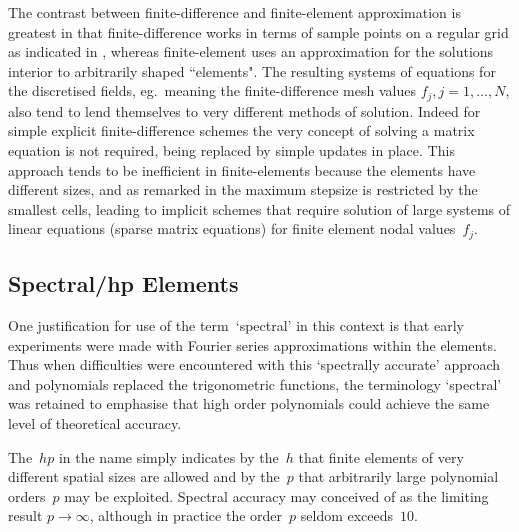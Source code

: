 The contrast between finite-difference and finite-element approximation is 
greatest in that finite-difference works in terms of sample points on a regular
grid as indicated in ,
whereas finite-element uses an approximation for the solutions interior
to arbitrarily shaped ``elements".
The resulting systems of equations for the discretised fields, eg.\
meaning the finite-difference mesh values
$f_j, j=1,\ldots,N$, also tend to lend themselves to very different methods of
solution. Indeed for simple explicit finite-difference schemes the very concept of 
solving a matrix equation is not required, being replaced by simple
updates in place. This approach tends to be inefficient in finite-elements because
the elements have different sizes, and as remarked in \Sec{geomprob}
the maximum stepsize is restricted by the smallest cells, leading to
implicit schemes that require solution of large systems of linear
equations (sparse matrix equations) for finite element nodal values~$f_j$.

\subsection{Spectral/hp Elements}\label{sec:semsub}
One justification for use of the term~`spectral' in this context is that early
experiments were made with Fourier series approximations within
the elements. Thus when difficulties were encountered with this
`spectrally accurate' approach and polynomials replaced the trigonometric
functions, the terminology `spectral' was retained to emphasise that high order
polynomials could achieve the same level of theoretical accuracy.

The~$hp$ in the name simply indicates by the~$h$ that finite elements of
very different spatial sizes are allowed and by the~$p$ that arbitrarily
large polynomial orders~$p$ may be exploited. Spectral accuracy may
conceived of as the limiting result $p\rightarrow\infty$, although
in practice the order~$p$ seldom exceeds~$10$.

